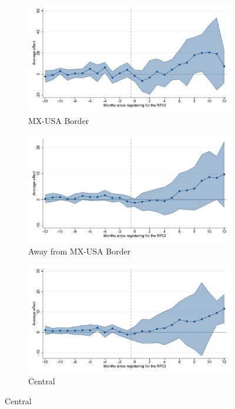 \begin{figure}[H]
    \centering
    \caption{Event studies - RPCI effect on formal wage}
    
    \begin{subfigure}{0.32\textwidth}
    \caption{MX-USA Border}
    \includegraphics[width=\textwidth]{04_Figures/muestra_10porciento/event_study_sal_formal_frontera_dcdh_connected.pdf}
    \end{subfigure}
    \begin{subfigure}{0.32\textwidth}
    \caption{Away from MX-USA Border}
    \includegraphics[width=\textwidth]{04_Figures/muestra_10porciento/event_study_sal_formal_no_frontera_dcdh_connected.pdf}
    \end{subfigure}
    \begin{subfigure}{0.32\textwidth}
    \caption{Central}
    \includegraphics[width=\textwidth]{04_Figures/muestra_10porciento/event_study_sal_formal_reg_centro_dcdh_connected.pdf}
    \end{subfigure}
    

\end{figure}
